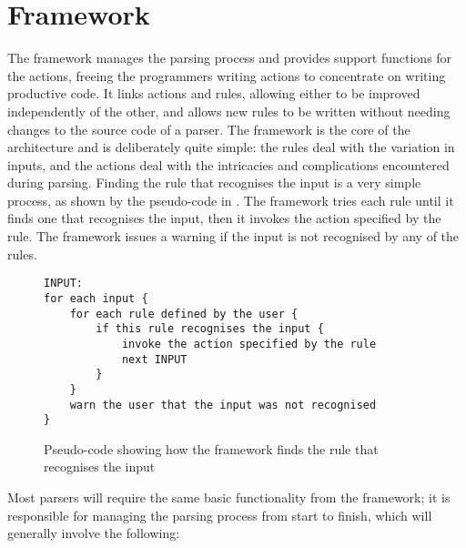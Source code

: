\section{Framework}

\label{framework in architecture}

The framework manages the parsing process and provides support functions
for the actions, freeing the programmers writing actions to concentrate on
writing productive code.  It links actions and rules, allowing either to be
improved independently of the other, and allows new rules to be written
without needing changes to the source code of a parser.  The framework is
the core of the architecture and is deliberately quite simple: the rules
deal with the variation in inputs, and the actions deal with the
intricacies and complications encountered during parsing.  Finding the rule
that recognises the input is a very simple process, as shown by the
pseudo-code in .  The framework tries each rule until it finds one that
recognises the input, then it invokes the action specified by the rule.
The framework issues a warning if the input is not recognised by any of the
rules.

\begin{figure}[thbp]
    \caption{Pseudo-code showing how the framework finds the rule that
    recognises the input}
    \empty{}\label{Pseudo-code describing how inputs are recognised}
\begin{verbatim}
INPUT:
for each input {
    for each rule defined by the user {
        if this rule recognises the input {
            invoke the action specified by the rule
            next INPUT
        }
    }
    warn the user that the input was not recognised
}
\end{verbatim}
\end{figure}

Most parsers will require the same basic functionality from the framework;
it is responsible for managing the parsing process from start to finish,
which will generally involve the following:

